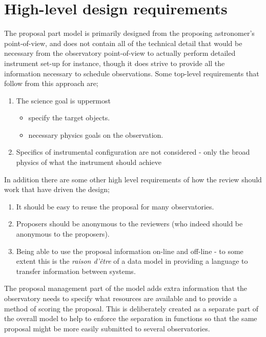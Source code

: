\documentclass[10pt,a4paper]{ivoa}
\begin{document}
\section{High-level design requirements}

The proposal part model is primarily designed from the proposing astronomer's point-of-view, and does not contain all of the technical detail
that would be necessary from the observatory point-of-view to actually perform detailed instrument set-up for instance, though it does
strive to provide all the information necessary to schedule observations. Some top-level requirements that follow from this approach are;

\begin{enumerate}
    \item The science goal is uppermost
    \begin{itemize}
        \item specify the target objects.
        \item necessary physics goals on the observation.
    \end{itemize}
    \item Specifics of instrumental configuration are not considered - only the broad physics of what the instrument should achieve
\end{enumerate}

In addition there are some other high level requirements of how the review should work that have driven the design;

\begin{enumerate}
    \item It should be easy to reuse the proposal for many observatories.
    \item Proposers should be anonymous to the reviewers (who indeed should be anonymous to the proposers).
    \item Being able to use the proposal information on-line and off-line - to some extent this is the \textit{raison d'\^{e}tre} of a data model
          in providing a language to transfer information between systems.
\end{enumerate}


The proposal management part of the model adds extra information that the observatory needs to specify what resources are available
and to provide a method of scoring the proposal. This is deliberately created as a separate part of the overall model to help
to enforce the separation in functions so that the same proposal might be more easily submitted to several observatories.
\end{document}
